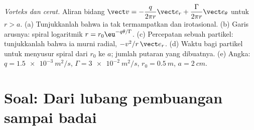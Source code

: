 \begin{exercise}[$\star\star\star$]\label{exo:b2:fluid-kinematics:12}
\emph{Vorteks dan cerat.} Aliran bidang $\vect v = -\dfrac{q}{2\pi r}\vect e_r +
\dfrac{\Gamma}{2\pi r}\vect e_\theta$ untuk $r > a$. (a) Tunjukkanlah bahwa ia
tak termampatkan dan irotasional. (b) Garis arusnya: spiral logaritmik
$r = r_0\eu^{-q\theta/\Gamma}$. (c) Percepatan sebuah partikel: tunjukkanlah bahwa ia
murni radial, $-v^2/r\,\vect e_r$. (d) Waktu bagi partikel untuk menyusur spiral
dari $r_0$ ke $a$; jumlah putaran yang dibuatnya. (e) Angka: $q =
\qty{1.5e-3}{m^2/s}$, $\Gamma = \qty{3e-2}{m^2/s}$, $r_0 = \qty{0.5}{m}$,
$a = \qty{2}{cm}$.
\end{exercise}

\section{Soal: Dari lubang pembuangan sampai badai}

